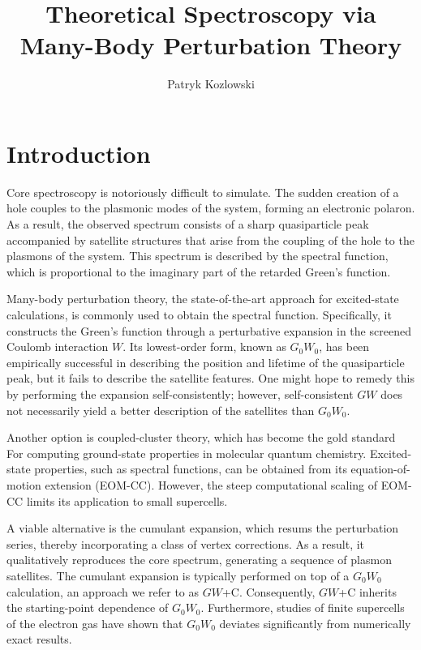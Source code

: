 \documentclass[letterpaper]{article}
\author[1]{Patryk Kozlowski}
\affil[1]{Department of Chemistry and Chemical Biology, Harvard University, Cambridge, MA 02138, USA}
\title{Theoretical Spectroscopy via Many-Body Perturbation Theory}
\begin{document}
\maketitle


\abstract{
}\section{Introduction}
\label{sec:intro}
Core spectroscopy is notoriously difficult to simulate. The sudden creation of a hole couples to the plasmonic modes of the system, forming an electronic polaron. As a result, the observed spectrum consists of a sharp quasiparticle peak accompanied by satellite structures that arise from the coupling of the hole to the plasmons of the system. This spectrum is described by the spectral function, which is proportional to the imaginary part of the retarded Green's function.

Many-body perturbation theory, the state-of-the-art approach for excited-state calculations, is commonly used to obtain the spectral function. Specifically, it constructs the Green's function through a perturbative expansion in the screened Coulomb interaction $W$. Its lowest-order form, known as $G_0W_0$, has been empirically successful in describing the position and lifetime of the quasiparticle peak, but it fails to describe the satellite features. One might hope to remedy this by performing the expansion self-consistently; however, self-consistent $GW$ does not necessarily yield a better description of the satellites than $G_0W_0$.

Another option is coupled-cluster theory, which has become the gold standard For computing ground-state properties in molecular quantum chemistry. Excited-state properties, such as spectral functions, can be obtained from its equation-of-motion extension (EOM-CC). However, the  steep computational scaling of EOM-CC limits its application to small supercells.

A viable alternative is the cumulant expansion, which resums the perturbation series, thereby incorporating a class of vertex corrections. As a result, it qualitatively reproduces the core spectrum, generating a sequence of plasmon satellites. The cumulant expansion is typically performed on top of a $G_0W_0$ calculation, an approach we refer to as $GW$+C. Consequently, $GW$+C inherits the starting-point dependence of $G_0W_0$. Furthermore, studies of finite supercells of the electron gas have shown that $G_0W_0$ deviates significantly from numerically exact results.
\end{document}
